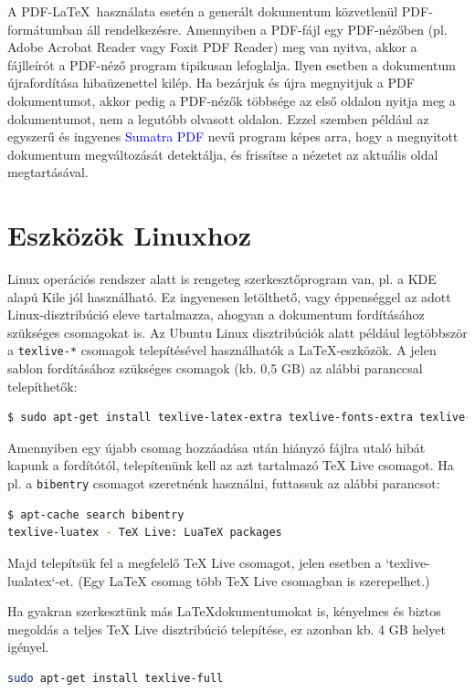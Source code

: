 A PDF-\LaTeX~használata esetén a generált dokumentum közvetlenül PDF-formátumban
áll rendelkezésre. Amennyiben a PDF-fájl egy PDF-nézőben (pl. Adobe Acrobat
Reader vagy Foxit PDF Reader) meg van nyitva, akkor a fájlleírót a PDF-néző
program tipikusan lefoglalja. Ilyen esetben a dokumentum újrafordítása
hibaüzenettel kilép. Ha bezárjuk és újra megnyitjuk a PDF dokumentumot, akkor
pedig a PDF-nézők többsége az első oldalon nyitja meg a dokumentumot, nem a
legutóbb olvasott oldalon. Ezzel szemben például az egyszerű és ingyenes
\textcolor{blue}{Sumatra PDF} nevű program képes arra, hogy a megnyitott
dokumentum megváltozását detektálja, és frissítse a nézetet az aktuális oldal
megtartásával.

\section{Eszközök Linuxhoz}
Linux operációs rendszer alatt is rengeteg szerkesztőprogram van, pl. a KDE
alapú Kile jól használható. Ez ingyenesen letölthető, vagy éppenséggel az adott
Linux-disztribúció eleve tartalmazza, ahogyan a dokumentum fordításához
szükséges csomagokat is. Az Ubuntu Linux disztribúciók alatt például legtöbbször
a \verb+texlive-*+ csomagok telepítésével használhatók a \LaTeX-eszközök. A
jelen sablon fordításához szükséges csomagok (kb. 0,5 GB) az alábbi paranccsal
telepíthetők:

\begin{lstlisting}[language=bash,morekeywords={sudo,apt\-get},alsoletter={-},breaklines=true]
$ sudo apt-get install texlive-latex-extra texlive-fonts-extra texlive-fonts-recommended texlive-xetex texlive-science
\end{lstlisting}

Amennyiben egy újabb csomag hozzáadása után hiányzó fájlra utaló hibát kapunk a
fordítótól, telepítenünk kell az azt tartalmazó TeX Live csomagot. Ha pl. a
\verb+bibentry+ csomagot szeretnénk használni, futtassuk az alábbi parancsot:

\begin{lstlisting}[language=bash,morekeywords={apt\-cache},alsoletter={-},breaklines=true]
$ apt-cache search bibentry
texlive-luatex - TeX Live: LuaTeX packages
\end{lstlisting}

Majd telepítsük fel a megfelelő TeX Live csomagot, jelen esetben a
`texlive-lualatex`-et. (Egy LaTeX csomag több TeX Live csomagban is
szerepelhet.)

Ha gyakran szerkesztünk más \LaTeX dokumentumokat is, kényelmes és biztos
megoldás a teljes TeX Live disztribúció telepítése, ez azonban kb. 4 GB helyet
igényel.

\begin{lstlisting}[language=bash,morekeywords={sudo,apt\-get},alsoletter={-},breaklines=true]
sudo apt-get install texlive-full
\end{lstlisting}
